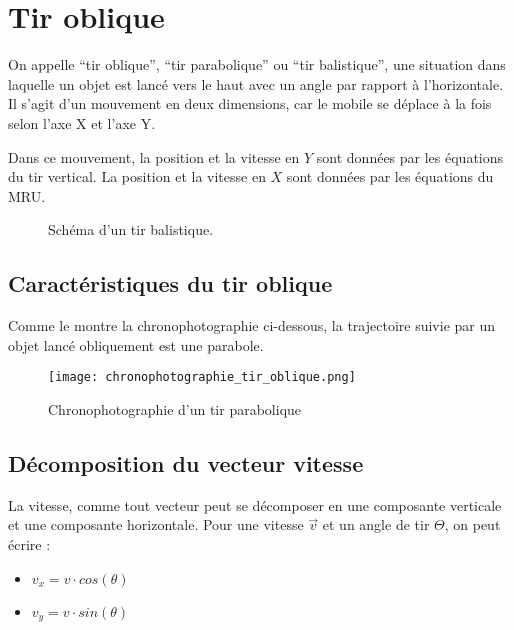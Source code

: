 \chapter{Tir oblique}
On appelle \enquote{tir oblique}, \enquote{tir parabolique} ou \enquote{tir balistique}, une situation dans laquelle un objet est lancé vers le haut avec un angle par rapport à l'horizontale. Il s'agit d'un mouvement en deux dimensions, car le mobile se déplace à la fois selon l'axe X et l'axe Y.
\begin{encadre}
    Dans ce mouvement, la position et la vitesse en \(Y\) sont données par les équations du tir vertical. La position et la vitesse en \(X\) sont données par les équations du MRU.
\end{encadre}

\begin{figure}[h!]
    \centering
    \resizebox{\linewidth}{!}{}
    \caption{Schéma d'un tir balistique.}
    \label{Schéma d'un tir balistique}
\end{figure}

\newpage

\section{Caractéristiques du tir oblique}
Comme le montre la chronophotographie ci-dessous, la trajectoire suivie par un objet lancé obliquement est une parabole.

\begin{figure}[h!]
    \centering
    \texttt{[image: chronophotographie\_tir\_oblique.png]}
    \caption{Chronophotographie d'un tir parabolique}
    \label{Chronophotographie d'un tir parabolique}
\end{figure}

\section{Décomposition du vecteur vitesse}
La vitesse, comme tout vecteur peut se décomposer en une composante verticale et une composante horizontale. Pour une vitesse \(\vec{v}\) et un angle de tir \(\Theta\), on peut écrire :
\begin{itemize}[label=\textbullet]
    \item \(v_x = v \cdot cos(\theta) \)
    \item \(v_y = v \cdot sin(\theta) \)
\end{itemize}

